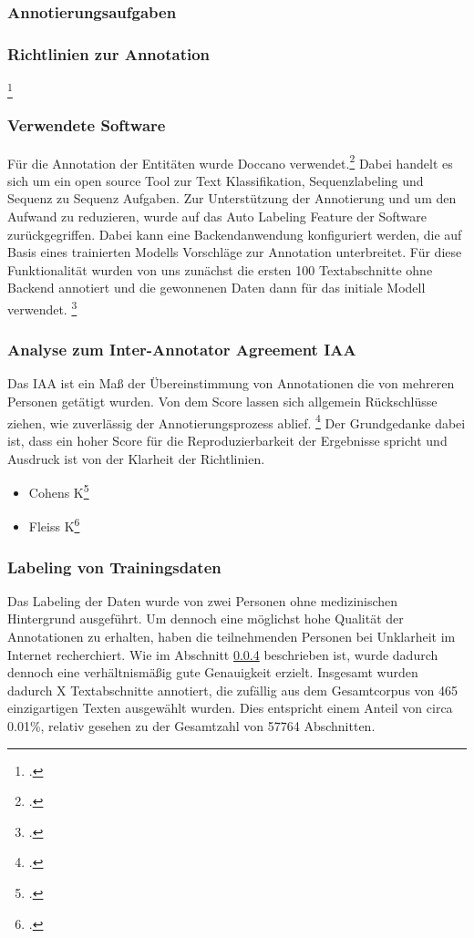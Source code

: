 \subsubsection{Annotierungsaufgaben}

\subsubsection{Richtlinien zur Annotation}
\footcite[vgl.][]{neves2014}

\subsubsection{Verwendete Software}
Für die Annotation der Entitäten wurde Doccano verwendet.\footcite[vgl.][S.]{hirokinakayama2021} Dabei handelt es sich um ein open source Tool zur Text Klassifikation, Sequenzlabeling und Sequenz zu Sequenz Aufgaben.
Zur Unterstützung der Annotierung und um den Aufwand zu reduzieren, wurde auf das Auto Labeling Feature der Software zurückgegriffen. Dabei kann eine Backendanwendung konfiguriert werden, die auf Basis eines trainierten Modells Vorschläge zur Annotation unterbreitet.
Für diese Funktionalität wurden von uns zunächst die ersten 100 Textabschnitte ohne Backend annotiert und die gewonnenen Daten dann für das initiale Modell verwendet.
\footcite[vgl.][]{neves2014a}

\subsubsection{Analyse zum Inter-Annotator Agreement \ac{IAA}}\label{sec:IAA}
Das \acf*{IAA} ist ein Maß der Übereinstimmung von Annotationen die von mehreren Personen getätigt wurden. Von dem Score lassen sich allgemein Rückschlüsse ziehen, wie zuverlässig der Annotierungsprozess ablief. \footcite[vgl.][S.298]{ide2017} Der Grundgedanke dabei ist, dass ein hoher Score für die Reproduzierbarkeit der Ergebnisse spricht und Ausdruck ist von der Klarheit der Richtlinien.

\begin{itemize}
    \item Cohens K\footcite[vgl.][S.]{cohen1960}
    \item Fleiss K\footcite[vgl.][S.]{fleiss1971}
\end{itemize}

\subsubsection{Labeling von Trainingsdaten}
Das Labeling der Daten wurde von zwei Personen ohne medizinischen Hintergrund ausgeführt. Um dennoch eine möglichst hohe Qualität der Annotationen zu erhalten, haben die teilnehmenden Personen bei Unklarheit im Internet recherchiert. Wie im Abschnitt \ref{sec:IAA} beschrieben ist, wurde dadurch dennoch eine verhältnismäßig gute Genauigkeit erzielt.
Insgesamt wurden dadurch X Textabschnitte annotiert, die zufällig aus dem Gesamtcorpus von 465 einzigartigen Texten ausgewählt wurden. Dies entspricht einem Anteil von circa 0.01\%, relativ gesehen zu der Gesamtzahl von 57764 Abschnitten.

